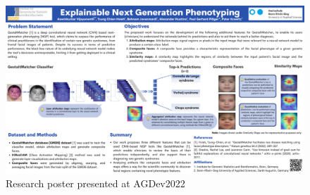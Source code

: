 \documentclass[../report.tex]{subfiles}
\begin{document}
\begin{itemize}
\begin{figure}
    	\includegraphics[scale=0.4]{images/poster_1.pdf}
    	\caption{Research poster presented at AGDev2022}
      \end{figure}
	\end{itemize}
\end{document}
